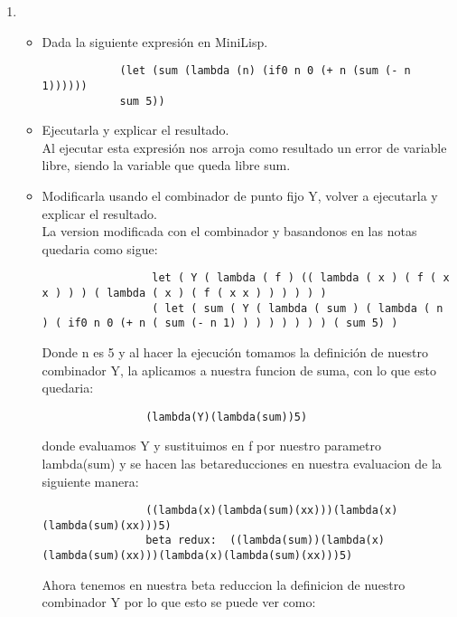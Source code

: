 \begin{enumerate}
    \item {
        \begin{itemize}
            \item Dada la siguiente expresión en MiniLisp.
            \begin{verbatim}
            (let (sum (lambda (n) (if0 n 0 (+ n (sum (- n 1))))))
            sum 5))
            \end{verbatim}
            \item {Ejecutarla y explicar el resultado.}\\
            Al ejecutar esta expresión nos arroja como resultado un error de variable libre, siendo la variable que queda libre sum.\\
            \item {Modificarla usando el combinador de punto fijo Y, volver a ejecutarla y explicar el resultado.}\\
            La version modificada con el combinador y basandonos en las notas quedaria como sigue:\\
            \begin{verbatim}
                 let ( Y ( lambda ( f ) (( lambda ( x ) ( f ( x x ) ) ) ( lambda ( x ) ( f ( x x ) ) ) ) ) ) 
                 ( let ( sum ( Y ( lambda ( sum ) ( lambda ( n ) ( if0 n 0 (+ n ( sum (- n 1) ) ) ) ) ) ) ) ( sum 5) )
            \end{verbatim}
            Donde n es 5 y al hacer la ejecución tomamos la definición de nuestro combinador Y, la aplicamos a nuestra funcion de suma, con lo que esto quedaria:\\
            \begin{verbatim}
                (lambda(Y)(lambda(sum))5)
            \end{verbatim}
            donde evaluamos Y y sustituimos en f por nuestro parametro lambda(sum) y se hacen las betareducciones en nuestra evaluacion de la siguiente manera:\\
            \begin{verbatim}
                ((lambda(x)(lambda(sum)(xx)))(lambda(x)(lambda(sum)(xx)))5)
                beta redux:  ((lambda(sum))(lambda(x)(lambda(sum)(xx)))(lambda(x)(lambda(sum)(xx)))5) 
            \end{verbatim}
            Ahora tenemos en nuestra beta reduccion la definicion de nuestro combinador Y por lo que esto se puede ver como:\\
            \begin{verbatim}

\end{verbatim}
\end{itemize}}
\end{enumerate}
